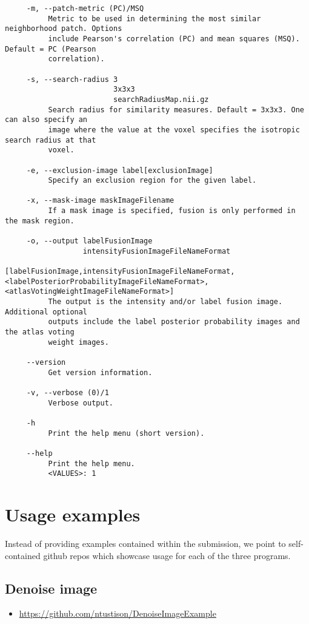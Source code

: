 \documentclass{InsightArticle}
\begin{document}
\begin{verbatim}
     -m, --patch-metric (PC)/MSQ
          Metric to be used in determining the most similar neighborhood patch. Options
          include Pearson's correlation (PC) and mean squares (MSQ). Default = PC (Pearson
          correlation).

     -s, --search-radius 3
                         3x3x3
                         searchRadiusMap.nii.gz
          Search radius for similarity measures. Default = 3x3x3. One can also specify an
          image where the value at the voxel specifies the isotropic search radius at that
          voxel.

     -e, --exclusion-image label[exclusionImage]
          Specify an exclusion region for the given label.

     -x, --mask-image maskImageFilename
          If a mask image is specified, fusion is only performed in the mask region.

     -o, --output labelFusionImage
                  intensityFusionImageFileNameFormat
                  [labelFusionImage,intensityFusionImageFileNameFormat,<labelPosteriorProbabilityImageFileNameFormat>,<atlasVotingWeightImageFileNameFormat>]
          The output is the intensity and/or label fusion image. Additional optional
          outputs include the label posterior probability images and the atlas voting
          weight images.

     --version
          Get version information.

     -v, --verbose (0)/1
          Verbose output.

     -h
          Print the help menu (short version).

     --help
          Print the help menu.
          <VALUES>: 1
\end{verbatim}
\normalsize

\section{Usage examples}

Instead of providing examples contained within the submission, we point to
self-contained github repos which showcase usage for each of the three
programs.

\subsection{Denoise image}

\begin{itemize}
  \item \url{https://github.com/ntustison/DenoiseImageExample}
\end{itemize}
\end{document}

